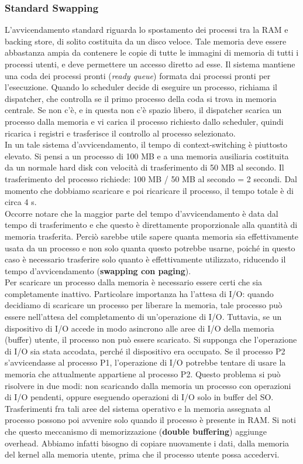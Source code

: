 \documentclass{article}
\begin{document}
			\subsubsection{Standard Swapping}
				L’avvicendamento standard riguarda lo spostamento dei processi tra la RAM e backing store, di solito costituita da un disco veloce. Tale memoria deve essere abbastanza ampia da contenere le copie di tutte le immagini di memoria di tutti i processi utenti, e deve permettere un accesso diretto ad esse. Il sistema mantiene una coda dei processi pronti (\textit{ready queue}) formata dai processi pronti per l’esecuzione. Quando lo scheduler decide di eseguire un processo, richiama il dispatcher, che controlla se il primo processo della coda si trova in memoria centrale. Se non c'è, e in questa non c’è spazio libero, il dispatcher scarica un processo dalla memoria e vi carica il processo richiesto dallo scheduler, quindi ricarica i registri e trasferisce il controllo al processo selezionato.
				\\In un tale sistema d’avvicendamento, il tempo di context-switching è piuttosto elevato. Si pensi a un processo di 100 MB e a una memoria ausiliaria costituita da un normale hard disk con velocità di trasferimento di 50 MB al secondo. Il trasferimento del processo richiede: 100 MB / 50 MB al secondo = 2 secondi. Dal momento che dobbiamo scaricare e poi ricaricare il processo, il tempo totale è di circa 4 s.
				\\Occorre notare che la maggior parte del tempo d’avvicendamento è data dal tempo di trasferimento e che questo è direttamente proporzionale alla quantità di memoria trasferita. Perciò sarebbe utile sapere quanta memoria sia effettivamente usata da un processo e non solo quanta questo potrebbe usarne, poiché in questo caso è necessario trasferire solo quanto è effettivamente utilizzato, riducendo il tempo d’avvicendamento (\textbf{swapping con paging}). 
				\\Per scaricare un processo dalla memoria è necessario essere certi che sia completamente inattivo. Particolare importanza ha l’attesa di I/O: quando decidiamo di scaricare un processo per liberare la memoria, tale processo può essere nell’attesa del completamento di un’operazione di I/O. Tuttavia, se un dispositivo di I/O accede in modo asincrono alle aree di I/O della memoria (buffer) utente, il processo non può essere scaricato. Si supponga che l’operazione di I/O sia stata accodata, perché il dispositivo era occupato. Se il processo P2 s’avvicendasse al processo P1, l’operazione di I/O potrebbe tentare di usare la memoria che attualmente appartiene al processo P2. Questo problema si può risolvere in due modi: non scaricando dalla memoria un processo con operazioni di I/O pendenti, oppure eseguendo operazioni di I/O solo in buffer del SO. Trasferimenti fra tali aree del sistema operativo e la memoria assegnata al processo possono poi avvenire solo quando il processo è presente in RAM. Si noti che questo meccanismo di memorizzazione (\textbf{double buffering}) aggiunge overhead. Abbiamo infatti bisogno di copiare nuovamente i dati, dalla memoria del kernel alla memoria utente, prima che il processo utente possa accedervi.
\end{document}
